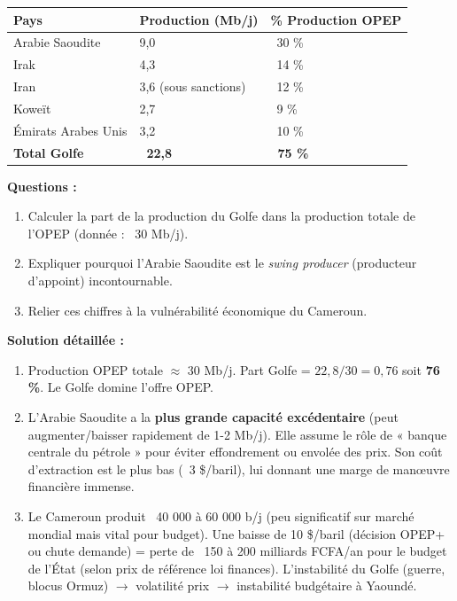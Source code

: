 \documentclass[11pt]{article}
\begin{document}
\begin{exoresolu}
\begin{center}
\begin{tabularx}{\linewidth}{|l|X|X|}\hline
\rowcolor{popblueL}
\textbf{Pays} & \textbf{Production (Mb/j)} & \textbf{\% Production OPEP} \\ \hline
Arabie Saoudite & 9,0 & ~30 \% \\ \hline
Irak & 4,3 & ~14 \% \\ \hline
Iran & 3,6 (sous sanctions) & ~12 \% \\ \hline
Koweït & 2,7 & ~9 \% \\ \hline
Émirats Arabes Unis & 3,2 & ~10 \% \\ \hline
\textbf{Total Golfe} & \textbf{~22,8} & \textbf{~75 \%} \\ \hline
\end{tabularx}
\end{center}
\textbf{Questions :}
\begin{enumerate}
    \item Calculer la part de la production du Golfe dans la production totale de l'OPEP (donnée : ~30 Mb/j).
    \item Expliquer pourquoi l'Arabie Saoudite est le \emph{swing producer} (producteur d'appoint) incontournable.
    \item Relier ces chiffres à la vulnérabilité économique du Cameroun.
\end{enumerate}
\tcblower
\textbf{Solution détaillée :}
\begin{enumerate}
    \item Production OPEP totale $\approx$ 30 Mb/j. Part Golfe = $22,8 / 30 = 0,76$ soit \textbf{76 \%}. Le Golfe domine l'offre OPEP.
    \item L'Arabie Saoudite a la \textbf{plus grande capacité excédentaire} (peut augmenter/baisser rapidement de 1-2 Mb/j). Elle assume le rôle de « banque centrale du pétrole » pour éviter effondrement ou envolée des prix. Son coût d'extraction est le plus bas (~3 \$/baril), lui donnant une marge de manœuvre financière immense.
    \item Le Cameroun produit ~40 000 à 60 000 b/j (peu significatif sur marché mondial mais vital pour budget). Une baisse de 10 \$/baril (décision OPEP+ ou chute demande) = perte de ~150 à 200 milliards FCFA/an pour le budget de l'État (selon prix de référence loi finances). L'instabilité du Golfe (guerre, blocus Ormuz) $\rightarrow$ volatilité prix $\rightarrow$ instabilité budgétaire à Yaoundé.
\end{enumerate}
\end{exoresolu}
\end{document}
